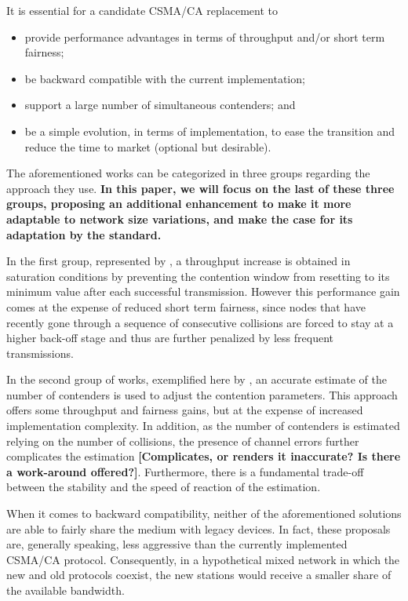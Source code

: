 \documentclass[conference]{IEEEtran}
\newcommand{\Az}[1]{{\bf{#1}}}
\begin{document}
It is essential for a candidate CSMA/CA replacement to
\begin{itemize}
  \item provide performance advantages in terms of throughput and/or short term fairness;
  \item be backward compatible with the current implementation;
  \item support a large number of simultaneous contenders; and 
  \item be a simple evolution, in terms of implementation, to ease the transition and reduce the time to market (optional but desirable).
\end{itemize}

The aforementioned works can be categorized in three groups regarding the approach they use. \Az{In this paper, we will focus on the last of these three groups, proposing an additional enhancement to make it more adaptable to network size variations, and make the case for its adaptation by the standard.}

In the first group, represented by \cite{bharghavan1994map,wang2004ncr}, a throughput increase is obtained in saturation conditions by preventing the contention window from resetting to its minimum value after each successful transmission. However this performance gain comes at the expense of reduced short term fairness, since nodes that have recently gone through a sequence of consecutive collisions are forced to stay at a higher back-off stage and thus are further penalized by less frequent transmissions.

In the second group of works, exemplified here by \cite{cali2000dti,lopez-toledo2006aoi}, an accurate estimate of the number of contenders is used to adjust the contention parameters. This approach offers some throughput and fairness gains, but at the expense of increased implementation complexity. In addition, as the number of contenders is estimated relying on the number of collisions, the presence of channel errors further complicates the estimation \Az{[Complicates, or renders it inaccurate? Is there a work-around offered?]}.
Furthermore, there is a fundamental trade-off between the stability and the speed of reaction of the estimation.

When it comes to backward compatibility, neither of the aforementioned solutions are able to fairly share the medium with legacy devices.
In fact, these proposals are, generally speaking, less aggressive than the currently implemented CSMA/CA protocol. Consequently, in a hypothetical mixed network in which the new and old protocols coexist, the new stations would receive a smaller share of the available bandwidth.
\end{document}
